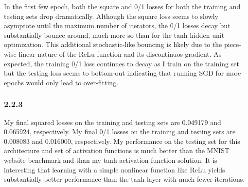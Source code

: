 \documentclass[12pt]{amsart}
\begin{document}
In the first few epoch, both the square and 0/1 losses for both the training and testing sets drop dramatically.  Although the square loss seems to slowly asymptote until the maximum number of iterators, the 0/1 losses decay but substantially bounce around, much more so than for the tanh hidden unit optimization.  This additional stochastic-like bouncing is likely due to the piece-wise linear nature of the ReLu function and its discontinuos gradient.  As expected, the training 0/1 loss continues to decay as I train on the training set but the testing loss seems to bottom-out indicating that running SGD for more epochs would only lead to over-fitting.

\subsubsection*{2.2.3}
My final squared losses on the training and testing sets are 0.049179 and 0.065924, respectively.  My final 0/1 losses on the training and testing sets are 0.008083 and 0.016000, respectively.  My performance on the testing set for this architecture and set of activation functions is much better than the MNIST website benchmark and than my tanh activation function solution.  It is interesting that learning with a simple nonlinear function like ReLu yields substantially better performance than the tanh layer with much fewer iterations.
\end{document}
